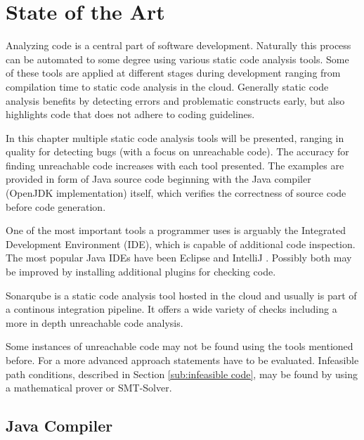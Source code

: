 
\chapter{State of the Art}
\label{cha:state of the art}

Analyzing code is a central part of software development. Naturally this process can be automated to some degree using various static code analysis tools. 
Some of these tools are applied at different stages during development ranging from compilation time to static code analysis in the cloud. 
Generally static code analysis benefits by detecting errors and problematic constructs early, but also highlights code that does not adhere to coding guidelines.


In this chapter multiple static code analysis tools will be presented, ranging in quality for detecting bugs (with a focus on unreachable code).
The accuracy for finding unreachable code increases with each tool presented. 
The examples are provided in form of Java source code beginning with the Java compiler (OpenJDK \cite{OpenJDK} implementation) itself, which verifies the correctness of source code before code generation. 


One of the most important tools a programmer uses is arguably the Integrated Development Environment (IDE), which is capable of additional code inspection. 
The most popular Java IDEs have been Eclipse \cite{incCommunityOpenInnovation} and IntelliJ \cite{IntelliJIDEACapable}. 
Possibly both may be improved by installing additional plugins for checking code.


Sonarqube \cite{sonarqube} is a static code analysis tool hosted in the cloud and usually is part of a continous integration pipeline. It offers a wide variety of checks including a more in depth unreachable code analysis.


Some instances of unreachable code may not be found using the tools mentioned before. For a more advanced approach statements have to be evaluated. Infeasible path conditions, described in Section \ref{sub:infeasible code}, may be found by using a mathematical prover or SMT-Solver.
\clearpage
\pagebreak
\section{Java Compiler}
\label{sec:Java compiler}

